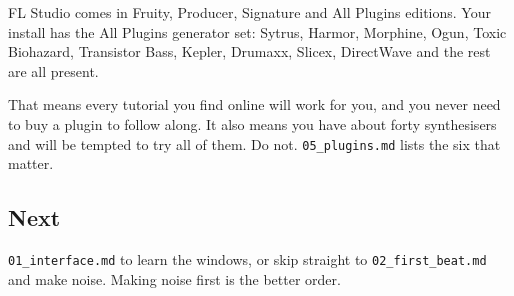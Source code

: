 FL Studio comes in Fruity, Producer, Signature and All Plugins editions. Your install has
the All Plugins generator set: Sytrus, Harmor, Morphine, Ogun, Toxic Biohazard, Transistor
Bass, Kepler, Drumaxx, Slicex, DirectWave and the rest are all present.

That means every tutorial you find online will work for you, and you never need to buy a
plugin to follow along. It also means you have about forty synthesisers and will be tempted
to try all of them. Do not. \texttt{05\_plugins.md} lists the six that matter.

\subsection{Next}\label{fl00_setup-next}

\texttt{01\_interface.md} to learn the windows, or skip straight to \texttt{02\_first\_beat.md} and make
noise. Making noise first is the better order.
